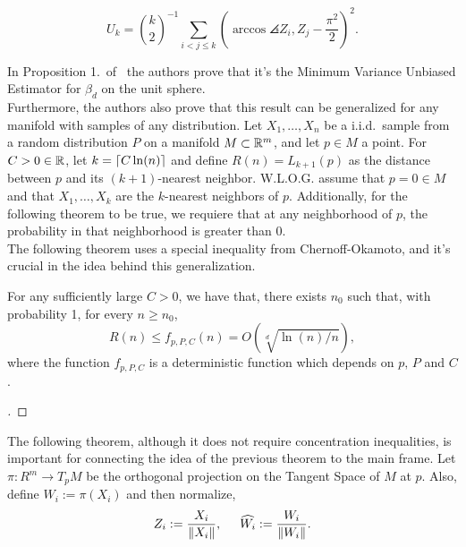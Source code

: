 \begin{equation}\label{ade:2}
  U_{k} = \binom{k}{2}^{-1} \sum_{i<j\leq k}{\left(
    \arccos\angles{Z_i, Z_j} - \frac{\pi^2}{2} 
    \right)}^{2}.
\end{equation}

In Proposition 1.\ of~\cite{diaz2019local} the authors prove that it's the Minimum Variance Unbiased Estimator for $\beta_d$ on the unit sphere.\\[0.5 em]

Furthermore, the authors also prove that this result can be generalized for any manifold with samples of any distribution. Let $X_1,\ldots, X_n$ be a i.i.d.\ sample from a random distribution $P$ on a manifold $M \subset \mathbb{R}^m$, and let $p \in M$ a point. For $C>0 \in  \mathbb{R}$, let $k = \left\lceil C \ln(n)\right\rceil$ and define $R(n) = L_{k+1}(p)$ as the distance between $p$ and its $(k+1)$-nearest neighbor. W.L.O.G. assume that $p = 0 \in M$ and that $X_1,\ldots, X_k$ are the $k$-nearest neighbors of $p$. Additionally, for the following theorem to be true, we requiere that at any neighborhood of $p$, the probability in that neighborhood is greater than 0.\\[0.5 em]

The following theorem uses a special inequality from Chernoff-Okamoto, and it's crucial in the idea behind this generalization.

\begin{theorem}\label{ade:T2}
  For any sufficiently large $C > 0$, we have that, there exists $n_0$ such that, with probability 1, for every $n \geq n_0$,
  \begin{equation}\label{ade:3}
    R(n) \leq f_{p,P,C}(n) = O(\sqrt[d]{\ln(n)/n}),
  \end{equation}
  where the function $f_{p,P,C}$ is a deterministic function which depends on $p,\, P$ and $C$.
\end{theorem}

\begin{proof}[]

\end{proof}

\vspace*{0.5 em}

The following theorem, although it does not require concentration inequalities, is important for connecting the idea of the previous theorem to the main frame. Let $\pi : R^m \to T_p M$ be the orthogonal projection on the Tangent Space of $M$ at $p$. Also, define $W_i := \pi(X_i)$ and then normalize,
\begin{equation}\label{ade:4}
  Z_i := \frac{X_i}{\|X_i\|},\hspace*{5mm} \widehat{W_i} := \frac{W_i}{\|W_i\|}.
\end{equation}

